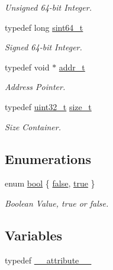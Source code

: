 \begin{DoxyCompactItemize}
\begin{DoxyCompactList}\small\item\em Unsigned 64-\/bit Integer. \end{DoxyCompactList}\item 
typedef long \hyperlink{a00035_a04761b9e7480e1e48b0d392da17fd5d4_a04761b9e7480e1e48b0d392da17fd5d4}{sint64\+\_\+t}
\begin{DoxyCompactList}\small\item\em Signed 64-\/bit Integer. \end{DoxyCompactList}\item 
typedef void $\ast$ \hyperlink{a00035_aa0015d6dd7c46f7b7a2ff7b5bf407f5c_aa0015d6dd7c46f7b7a2ff7b5bf407f5c}{addr\+\_\+t}
\begin{DoxyCompactList}\small\item\em Address Pointer. \end{DoxyCompactList}\item 
typedef \hyperlink{a00035_a435d1572bf3f880d55459d9805097f62_a435d1572bf3f880d55459d9805097f62}{uint32\+\_\+t} \hyperlink{a00035_a29d85914ddff32967d85ada69854206d_a29d85914ddff32967d85ada69854206d}{size\+\_\+t}
\begin{DoxyCompactList}\small\item\em Size Container. \end{DoxyCompactList}\end{DoxyCompactItemize}
\subsection*{Enumerations}
\begin{DoxyCompactItemize}
\item 
enum \hyperlink{a00035_af6a258d8f3ee5206d682d799316314b1_af6a258d8f3ee5206d682d799316314b1}{bool} \{ \hyperlink{a00035_af6a258d8f3ee5206d682d799316314b1_af6a258d8f3ee5206d682d799316314b1ae9de385ef6fe9bf3360d1038396b884c}{false}, 
\hyperlink{a00035_af6a258d8f3ee5206d682d799316314b1_af6a258d8f3ee5206d682d799316314b1a08f175a5505a10b9ed657defeb050e4b}{true}
 \}\begin{DoxyCompactList}\small\item\em Boolean Value, true or false. \end{DoxyCompactList}
\end{DoxyCompactItemize}
\subsection*{Variables}
\begin{DoxyCompactItemize}
\item 
typedef \hyperlink{a00035_acf8c839d8a7a12772ebd4b8a4c087034_acf8c839d8a7a12772ebd4b8a4c087034}{\+\_\+\+\_\+attribute\+\_\+\+\_\+}
\end{DoxyCompactItemize}


